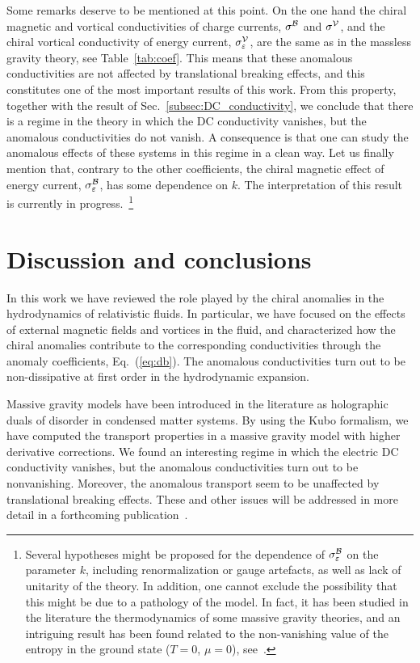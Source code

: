 \documentclass[a4paper]{jpconf}
\begin{document}
Some remarks deserve to be mentioned at this point. On the one hand the chiral magnetic and vortical conductivities of charge currents, $\sigma^{\cal B}$ and $\sigma^{\cal V}$, and the chiral vortical conductivity of energy current, $\sigma_\varepsilon^{\cal V}$, are the same as in the massless gravity theory, see Table~\ref{tab:coef}. This means that these anomalous conductivities are not affected by translational breaking effects, and this constitutes one of the most important results of this work. From this property, together with the result of Sec.~\ref{subsec:DC_conductivity}, we conclude that there is a regime in the theory in which the DC conductivity vanishes, but the anomalous conductivities do not vanish. A consequence is that one can study the anomalous effects of these systems in this regime in a clean way. Let us finally mention that, contrary to the other coefficients, the chiral magnetic effect of energy current, $\sigma_\varepsilon^{\cal B}$, has some dependence on $k$. The interpretation of this result is currently in progress.~\footnote{Several hypotheses might be proposed for the dependence of $\sigma_\varepsilon^{\cal B}$ on the parameter $k$, including renormalization or gauge artefacts, as well as lack of unitarity of the theory. In addition, one cannot exclude the possibility that this might be due to a pathology of the model. In fact, it has been studied in the literature the thermodynamics of some massive gravity theories, and an intriguing result has been found related to the non-vanishing value of the entropy in the ground state ($T=0$, $\mu=0$), see~\cite{Vegh:2013sk}.}




\section{Discussion and conclusions}
\label{sec:conclusions}

In this work we have reviewed the role played by the chiral anomalies in the hydrodynamics of relativistic fluids. In particular, we have focused on the effects of external magnetic fields and vortices in the fluid, and characterized how the chiral anomalies contribute to the corresponding conductivities through the anomaly coefficients, Eq.~(\ref{eq:db}). The anomalous conductivities turn out to be non-dissipative at first order in the hydrodynamic expansion.

Massive gravity models have been introduced in the literature as holographic duals of disorder in condensed matter systems. By using the Kubo formalism, we have computed the transport properties in a massive gravity model with higher derivative corrections. We found an interesting regime in which the electric DC conductivity vanishes, but the anomalous conductivities turn out to be nonvanishing. Moreover, the anomalous transport seem to be unaffected by translational breaking effects. These and other issues will be addressed in more detail in a forthcoming publication~\cite{workinprogress}.
\end{document}
